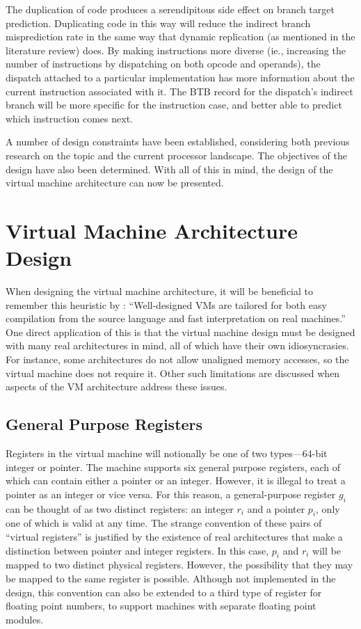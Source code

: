 	The duplication of code produces a serendipitous side effect on branch target prediction. Duplicating code in this way will reduce the indirect branch misprediction rate in the same way that dynamic replication (as mentioned in the literature review) does. By making instructions more diverse (ie., increasing the number of instructions by dispatching on both opcode and operands), the dispatch attached to a particular implementation has more information about the current instruction associated with it. The BTB record for the dispatch's indirect branch will be more specific for the instruction case, and better able to predict which instruction comes next.
	
	A number of design constraints have been established, considering both previous research on the topic and the current processor landscape. The objectives of the design have also been determined. With all of this in mind, the design of the virtual machine architecture can now be presented.
	
	\section{Virtual Machine Architecture Design}
		When designing the virtual machine architecture, it will be beneficial to remember this heuristic by \cite{structureinterpreters}: ``Well-designed VMs are tailored for both easy compilation from the source language and fast interpretation on real machines.'' One direct application of this is that the virtual machine design must be designed with many real architectures in mind, all of which have their own idiosyncrasies. For instance, some architectures do not allow unaligned memory accesses, so the virtual machine does not require it. Other such limitations are discussed when aspects of the VM architecture address these issues.
		
		\subsection{General Purpose Registers}
		Registers in the virtual machine will notionally be one of two types---64-bit integer or pointer. The machine supports six general purpose registers, each of which can contain either a pointer or an integer. However, it is illegal to treat a pointer as an integer or vice versa. For this reason, a general-purpose register $g_i$ can be thought of as two distinct registers: an integer $r_i$ and a pointer $p_i$, only one of which is valid at any time. The strange convention of these pairs of ``virtual registers'' is justified by the existence of real architectures that make a distinction between pointer and integer registers. In this case, $p_i$ and $r_i$ will be mapped to two distinct physical registers. However, the possibility that they may be mapped to the same register is possible. Although not implemented in the design, this convention can also be extended to a third type of register for floating point numbers, to support machines with separate floating point modules.
		
